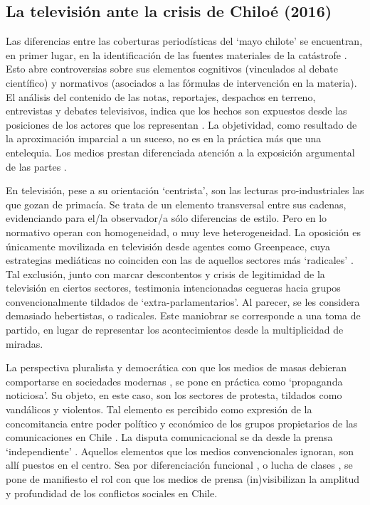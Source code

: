 \documentclass{textolivre}
\begin{document}
\subsection{La televisión ante la crisis de Chiloé (2016)}\label{sec-latelev}

Las diferencias entre las coberturas periodísticas del ‘mayo chilote’ se encuentran,
en primer lugar, en la identificación de las fuentes materiales de la catástrofe
\cite{Mascareo2018b}. Esto abre controversias sobre sus elementos cognitivos
(vinculados al debate científico) y normativos (asociados a las fórmulas de intervención
en la materia). El análisis del contenido de las notas, reportajes, despachos en terreno,
entrevistas y debates televisivos, indica que los hechos son expuestos desde las
posiciones de los actores que los representan \cite{cabello2018}.
La objetividad, como resultado de la aproximación imparcial a un suceso, no es en la
práctica más que una entelequia. Los medios prestan diferenciada atención a la
exposición argumental de las partes \cite{ValdebenitoAllendes2018}.

En televisión, pese a su orientación ‘centrista’, son las lecturas pro-industriales las
que gozan de primacía. Se trata de un elemento transversal entre sus cadenas,
evidenciando para el/la observador/a sólo diferencias de estilo. Pero en lo normativo
operan con homogeneidad, o muy leve heterogeneidad. La oposición es únicamente
movilizada en televisión desde agentes como Greenpeace, cuya estrategias mediáticas
no coinciden con las de aquellos sectores más ‘radicales’ \cite{ciudadano2016}. Tal
exclusión, junto con marcar descontentos y crisis de legitimidad de la televisión en ciertos
sectores, testimonia intencionadas cegueras hacia grupos convencionalmente tildados de
‘extra-parlamentarios’. Al parecer, se les considera demasiado hebertistas, o radicales.
Este maniobrar se corresponde a una toma de partido, en lugar de representar los
acontecimientos desde la multiplicidad de miradas.

La perspectiva pluralista y democrática con que los medios de masas debieran
comportarse en sociedades modernas \cite{Habermas2006}, se pone en práctica como
‘propaganda noticiosa’. Su objeto, en este caso, son los sectores de protesta, tildados
como vandálicos y violentos. Tal elemento es percibido como expresión de la
concomitancia entre poder político y económico de los grupos propietarios de las
comunicaciones en Chile \cite{Santander2014,solimano}. La disputa
comunicacional se da desde la prensa ‘independiente’ \cite{desconcierto}.
Aquellos elementos que los medios convencionales ignoran, son allí puestos en el centro.
Sea por diferenciación funcional \cite{Luhmann2007}, o lucha de clases \cite{marx2013}, se
pone de manifiesto el rol con que los medios de prensa (in)visibilizan la amplitud y
profundidad de los conflictos sociales en Chile.
\end{document}
